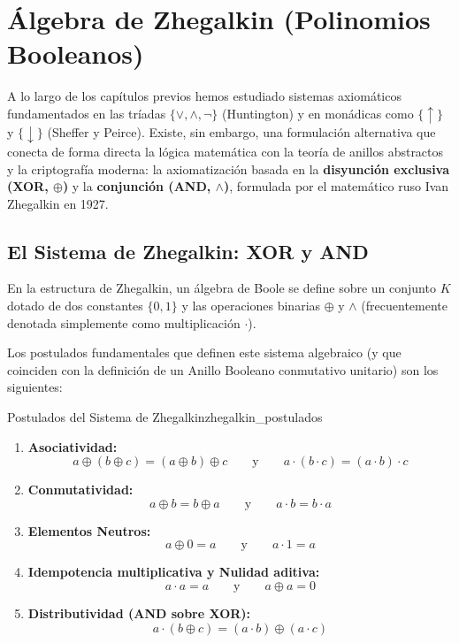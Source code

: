 \chapter{Álgebra de Zhegalkin (Polinomios Booleanos)}
\label{capitulo:zhegalkin}

A lo largo de los capítulos previos hemos estudiado sistemas axiomáticos fundamentados en las tríadas $\{\vee, \wedge, \neg\}$ (Huntington) y en monádicas como $\{\uparrow\}$ y $\{\downarrow\}$ (Sheffer y Peirce). Existe, sin embargo, una formulación alternativa que conecta de forma directa la lógica matemática con la teoría de anillos abstractos y la criptografía moderna: la axiomatización basada en la \textbf{disyunción exclusiva (XOR, $\oplus$)} y la \textbf{conjunción (AND, $\wedge$)}, formulada por el matemático ruso Ivan Zhegalkin en 1927.

\section{El Sistema de Zhegalkin: XOR y AND}

En la estructura de Zhegalkin, un álgebra de Boole se define sobre un conjunto $K$ dotado de dos constantes $\{0, 1\}$ y las operaciones binarias $\oplus$ y $\wedge$ (frecuentemente denotada simplemente como multiplicación $\cdot$). 

Los postulados fundamentales que definen este sistema algebraico (y que coinciden con la definición de un Anillo Booleano conmutativo unitario) son los siguientes:

\begin{teorema}{Postulados del Sistema de Zhegalkin}{zhegalkin_postulados}
\begin{enumerate}
    \item \textbf{Asociatividad:} 
    \[ a \oplus (b \oplus c) = (a \oplus b) \oplus c \qquad \text{y} \qquad a \cdot (b \cdot c) = (a \cdot b) \cdot c \]
    \item \textbf{Conmutatividad:} 
    \[ a \oplus b = b \oplus a \qquad \text{y} \qquad a \cdot b = b \cdot a \]
    \item \textbf{Elementos Neutros:} 
    \[ a \oplus 0 = a \qquad \text{y} \qquad a \cdot 1 = a \]
    \item \textbf{Idempotencia multiplicativa y Nulidad aditiva:} 
    \[ a \cdot a = a \qquad \text{y} \qquad a \oplus a = 0 \]
    \item \textbf{Distributividad (AND sobre XOR):} 
    \[ a \cdot (b \oplus c) = (a \cdot b) \oplus (a \cdot c) \]
\end{enumerate}
\end{teorema}

